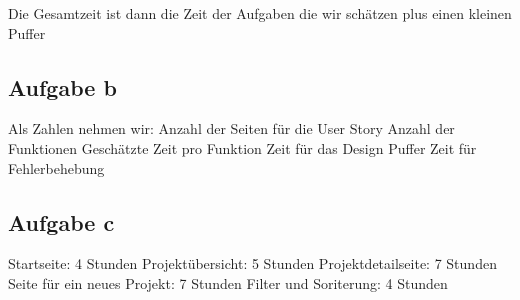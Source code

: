 \documentclass{article}
\begin{document}
Die Gesamtzeit ist dann die Zeit der Aufgaben die wir schätzen plus einen kleinen Puffer

\subsection{Aufgabe b}
Als Zahlen nehmen wir: 
Anzahl der Seiten für die User Story
Anzahl der Funktionen
Geschätzte Zeit pro Funktion
Zeit für das Design
Puffer Zeit für Fehlerbehebung

\subsection{Aufgabe c}
Startseite: 4 Stunden
Projektübersicht: 5 Stunden
Projektdetailseite: 7 Stunden
Seite für ein neues Projekt: 7 Stunden
Filter und Soriterung: 4 Stunden
\end{document}
